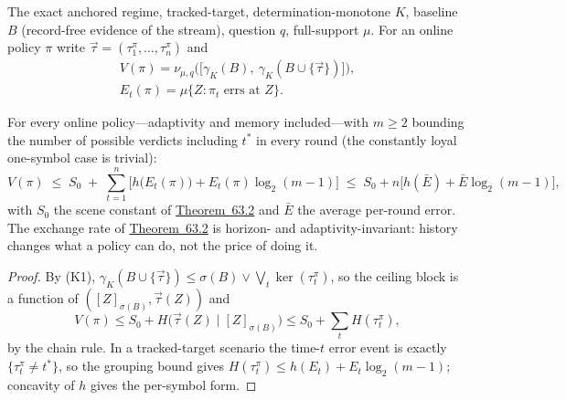 
The exact anchored regime, tracked-target, determination-monotone \(K\), baseline \(B\) (record-free evidence of the stream), question \(q\), full-support \(\mu\). For an online policy \(\pi\) write \(\vec\tau = (\tau^\pi_1, \dots, \tau^\pi_n)\) and
\[\begin{gathered}V(\pi) = \nu_{\mu,q}\big(\big[\gamma_K(B),\ \gamma_K(B \cup \{\vec\tau\})\big]\big), \\ E_t(\pi) = \mu\{Z : \pi_t \text{ errs at } Z\}.\end{gathered}\]

\begin{thmplain}

For every online policy---\hspace{0pt}adaptivity and memory included---\hspace{0pt}with \(m\ge2\) bounding the number of possible verdicts including \(t^*\) in every round (the constantly loyal one-symbol case is trivial):
\[
V(\pi) \;\le\; S_0 \;+\; \sum_{t=1}^{n} \Big[ h\big(E_t(\pi)\big) + E_t(\pi)\log_2(m-1) \Big]
\;\le\; S_0 + n\Big[h(\bar E) + \bar E \log_2(m-1)\Big],
\]
with \(S_0\) the scene constant of \hyperlink{stmt:63.2}{Theorem~63.2} and \(\bar E\) the average per-round error. The exchange rate of \hyperlink{stmt:63.2}{Theorem~63.2} is horizon- and adaptivity-invariant: history changes what a policy can do, not the price of doing it.
\end{thmplain}

\begin{proof}

By (K1), \(\gamma_K(B \cup \{\vec\tau\}) \le \sigma(B) \vee \bigvee_t \ker(\tau^\pi_t)\), so the ceiling block is a function of \(([Z]_{\sigma(B)}, \vec\tau(Z))\) and
\[
V(\pi) \le S_0 + H\big(\vec\tau(Z) \mid [Z]_{\sigma(B)}\big) \le S_0 + \sum_t H(\tau^\pi_t) ,
\]
by the chain rule. In a tracked-target scenario the time-\(t\) error event is exactly \(\{\tau^\pi_t \ne t^*\}\), so the grouping bound gives \(H(\tau^\pi_t) \le h(E_t) + E_t \log_2(m-1)\); concavity of \(h\) gives the per-symbol form.
\end{proof}

